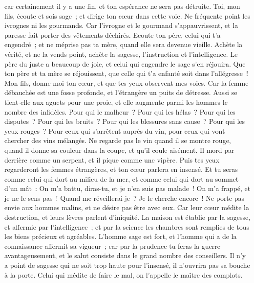 \begin{multicols}{2}
car certainement il y a une fin, et ton espérance ne sera pas détruite.
Toi, mon fils, écoute et sois sage~; et dirige ton cœur dans cette voie.
Ne fréquente point les ivrognes ni les gourmands.
Car l'ivrogne et le gourmand s'appauvrissent, et la paresse fait porter des vêtements déchirés.
Ecoute ton père, celui qui t'a engendré~; et ne méprise pas ta mère, quand elle sera devenue vieille.
Achète la vérité, et ne la vends point, achète la sagesse, l'instruction et l'intelligence.
Le père du juste a beaucoup de joie, et celui qui engendre le sage s'en réjouira.
Que ton père et ta mère se réjouissent, que celle qui t'a enfanté soit dans l'allégresse~!
Mon fils, donne-moi ton cœur, et que tes yeux observent mes voies.
Car la femme débauchée est une fosse profonde, et l'étrangère un puits de détresse.
Aussi se tient-elle aux aguets pour une proie, et elle augmente parmi les hommes le nombre des infidèles.
Pour qui le malheur~? Pour qui les hélas~? Pour qui les disputes~? Pour qui les bruits~? Pour qui les blessures sans cause~? Pour qui les yeux rouges~?
Pour ceux qui s'arrêtent auprès du vin, pour ceux qui vont chercher des vins mélangés.
Ne regarde pas le vin quand il se montre rouge, quand il donne sa couleur dans la coupe, et qu'il coule aisément.
Il mord par derrière comme un serpent, et il pique comme une vipère.
Puis tes yeux regarderont les femmes étrangères, et ton cœur parlera en insensé.
Et tu seras comme celui qui dort au milieu de la mer, et comme celui qui dort au sommet d'un mât~:
On m'a battu, diras-tu, et je n'en suis pas malade~! On m'a frappé, et je ne le sens pas~! Quand me réveillerai-je~? Je le cherche encore~!
\VerseOne{}Ne porte pas envie aux hommes malins, et ne désire pas être avec eux.
Car leur cœur médite la destruction, et leurs lèvres parlent d'iniquité.
La maison est établie par la sagesse, et affermie par l'intelligence~;
et par la science les chambres sont remplies de tous les biens précieux et agréables.
L'homme sage est fort, et l'homme qui a de la connaissance affermit sa vigueur~;
car par la prudence tu feras la guerre avantageusement, et le salut consiste dans le grand nombre des conseillers.
Il n'y a point de sagesse qui ne soit trop haute pour l'insensé, il n'ouvrira pas sa bouche à la porte.
Celui qui médite de faire le mal, on l'appelle le maître des complots.

\end{multicols}

